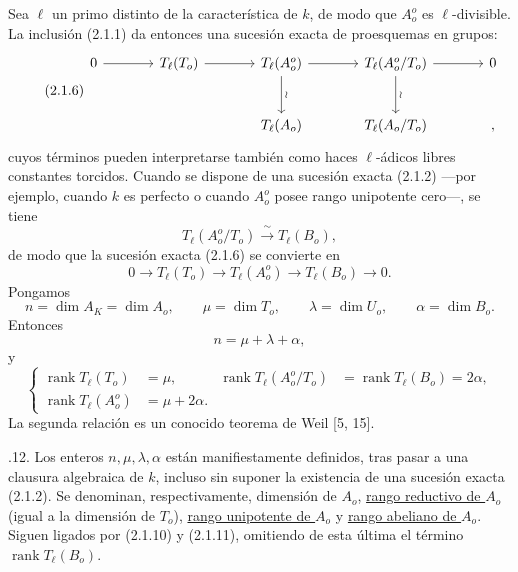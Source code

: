 Sea $\ell$ un primo distinto de la característica de $k$, de modo que
$A_o^o$ es $\ell$-divisible. La inclusión (2.1.1) da entonces una
sucesión exacta de proesquemas en grupos:
\begin{equation}\tag{2.1.6}
\begin{tikzcd}[row sep=large,column sep=large]
0 \arrow[r] & T_\ell(T_o) \arrow[r]
 & T_\ell(A_o^o) \arrow[r] \arrow[d,"\wr"]
 & T_\ell(A_o^o/T_o) \arrow[r] \arrow[d,"\wr"] & 0\\
 & & T_\ell(A_o) & T_\ell(A_o/T_o) & {,}
\end{tikzcd}
\end{equation}
cuyos términos pueden interpretarse también como haces $\ell$-ádicos
libres constantes torcidos. Cuando se dispone de una sucesión exacta
(2.1.2) ---por ejemplo, cuando $k$ es perfecto o cuando $A_o^o$ posee
rango unipotente cero---, se tiene
\begin{equation}\tag{2.1.7}
 T_\ell(A_o^o/T_o)\xrightarrow{\ \sim\ }T_\ell(B_o),
\end{equation}
de modo que la sucesión exacta (2.1.6) se convierte en
\begin{equation}\tag{2.1.8}
 0\longrightarrow T_\ell(T_o)\longrightarrow T_\ell(A_o^o)
 \longrightarrow T_\ell(B_o)\longrightarrow0.
\end{equation}
Pongamos
\begin{equation}\tag{2.1.9}
 n=\dim A_K=\dim A_o,\qquad
 \mu=\dim T_o,\qquad
 \lambda=\dim U_o,\qquad
 \alpha=\dim B_o.
\end{equation}
Entonces
\begin{equation}\tag{2.1.10}
 n=\mu+\lambda+\alpha,
\end{equation}
y
\begin{equation}\tag{2.1.11}
 \left\{
 \begin{aligned}
 \operatorname{rank}T_\ell(T_o)&=\mu,&
 \operatorname{rank}T_\ell(A_o^o/T_o)
 &=\operatorname{rank}T_\ell(B_o)=2\alpha,\\
 \operatorname{rank}T_\ell(A_o^o)&=\mu+2\alpha.
 \end{aligned}
 \right.
\end{equation}
La segunda relación es un conocido teorema de Weil [5, 15].

\medskip
{}.12. Los enteros $n,\mu,\lambda,\alpha$ están manifiestamente
definidos, tras pasar a una clausura algebraica de $k$, incluso sin
suponer la existencia de una sucesión exacta (2.1.2). Se denominan,
respectivamente, dimensión de $A_o$, \underline{rango reductivo de
$A_o$} (igual a la dimensión de $T_o$), \underline{rango unipotente de
$A_o$} y \underline{rango abeliano de $A_o$}. Siguen ligados por
(2.1.10) y (2.1.11), omitiendo de esta última el término
$\operatorname{rank}T_\ell(B_o)$.

